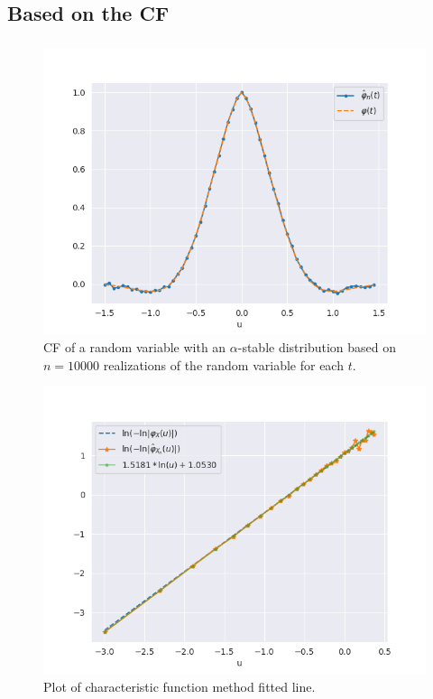 \documentclass{article}
\begin{document}
		\subsection{Based on the CF}
		\subsubsection{}
		\begin{figure}[H]
				\centering
				\includegraphics[width=1\linewidth]{images/stable_CF.png}
			\caption{CF of a random variable with an $\alpha$-stable distribution based on $n=10000$ realizations of the random variable for each $t$.}
		\end{figure}

		\begin{figure}[H]
			\centering
			\includegraphics[width=1\linewidth]{images/compare_cf.png}
			\caption{Plot of characteristic function method fitted line.}\label{CF_line}
		\end{figure}
\end{document}
